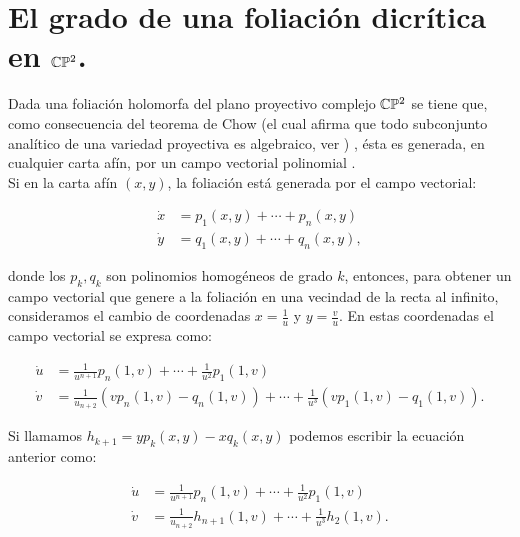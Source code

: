 \section{El grado de una foliación dicrítica en $\mathbb{C}\mathbb{P}^{2}$.}

Dada una foliación holomorfa del plano proyectivo complejo $\mathbb{C}\mathbb{P}^2$ se tiene que, como consecuencia del teorema de Chow (el cual afirma que todo subconjunto analítico de una variedad proyectiva es algebraico, ver \cite{Mumford}) , ésta es generada, en cualquier carta afín, por un campo vectorial polinomial \cite[p.~477]{IlyaYako}.\\

Si en la carta afín $(x,y)$, la foliación está generada por el campo vectorial:

\begin{equation}
\label{EcuacionEnCP2}
\begin{aligned}
\dot{x} &=p_{1}(x,y)+\cdots+p_{n}(x,y)\\
\dot{y} &=q_{1}(x,y)+\cdots+q_{n}(x,y),
\end{aligned}
\end{equation}

\noindent donde los $p_{k},q_{k}$ son polinomios homogéneos de grado $k$, entonces, para obtener un campo vectorial que genere a la foliación en una vecindad de la recta al infinito, consideramos el cambio de coordenadas $x=\tfrac{1}{u}$ y $y=\tfrac{v}{u}$. En estas coordenadas el campo vectorial se expresa como:

\begin{equation}
\begin{aligned}
\dot{u} &=\frac{1}{u^{n+1}}p_{n}(1,v)+\cdots+\frac{1}{u^{2}}p_{1}(1,v)\\
\dot{v} &=\frac{1}{u_{n+2}}(vp_{n}(1,v)-q_{n}(1,v))+\cdots+\frac{1}{u^{3}}(vp_{1}(1,v)-q_{1}(1,v)).
\end{aligned}
\end{equation}

Si llamamos $h_{k+1}=yp_{k}(x,y)-xq_{k}(x,y)$ podemos escribir la ecuación anterior como:

\begin{equation}
\label{EcuacionEnCP2Infinito}
\begin{aligned}
\dot{u} &=\frac{1}{u^{n+1}}p_{n}(1,v)+\cdots+\frac{1}{u^{2}}p_{1}(1,v)\\
\dot{v} &=\frac{1}{u_{n+2}}h_{n+1}(1,v)+\cdots+\frac{1}{u^{3}}h_{2}(1,v).
\end{aligned}
\end{equation}

